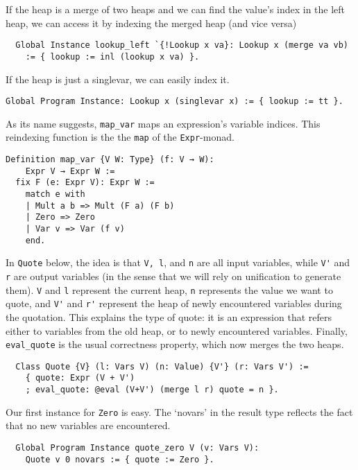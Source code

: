 \documentclass[a4paper,10pt,runningheads]{llncs}
\begin{document}

If the heap is a merge of two heaps and we can find the value's index in the left heap, we can
access it by indexing the merged heap (and vice versa)
\begin{lstlisting}
  Global Instance lookup_left `{!Lookup x va}: Lookup x (merge va vb)
    := { lookup := inl (lookup x va) }.
\end{lstlisting}

If the heap is just a singlevar, we can easily index it.
\begin{lstlisting}
Global Program Instance: Lookup x (singlevar x) := { lookup := tt }.
\end{lstlisting}


 As its name suggests, \lstinline|map_var| maps an expression's variable indices.
This reindexing function is the the \lstinline|map| of the \lstinline|Expr|-monad.

\begin{lstlisting}
Definition map_var {V W: Type} (f: V → W):
    Expr V → Expr W :=
  fix F (e: Expr V): Expr W :=
    match e with
    | Mult a b => Mult (F a) (F b)
    | Zero => Zero
    | Var v => Var (f v)
    end.
\end{lstlisting}

In \lstinline|Quote| below, the idea is that \lstinline|V, l|, and \lstinline|n| are all input variables, while \lstinline|V'| and \lstinline|r| are
output variables (in the sense that we will rely on unification to generate them). \lstinline|V| and \lstinline|l|
represent the current heap, \lstinline|n| represents the value we want to quote, and \lstinline|V'| and \lstinline|r'| represent
the heap of newly encountered variables during the quotation.
  This explains the type of quote: it is an expression that refers either to variables from
the old heap, or to newly encountered variables. Finally, \lstinline|eval_quote| is the usual correctness property, which now merges the two heaps.

\begin{lstlisting}
  Class Quote {V} (l: Vars V) (n: Value) {V'} (r: Vars V') :=
    { quote: Expr (V + V')
    ; eval_quote: @eval (V+V') (merge l r) quote = n }.
\end{lstlisting}


Our first instance for \lstinline|Zero| is easy. The `novars' in the result type reflects the fact that no
new variables are encountered.
\begin{lstlisting}
  Global Program Instance quote_zero V (v: Vars V):
    Quote v 0 novars := { quote := Zero }.
\end{lstlisting}
\end{document}
